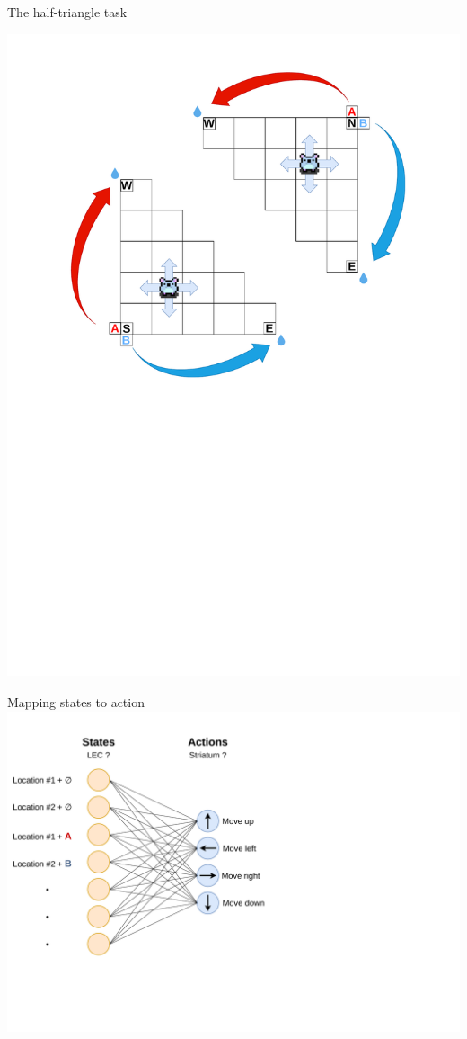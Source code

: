 \documentclass[bigger]{beamer}
\begin{document}
\begin{frame}[label={sec:org46cf4c0}]{The half-triangle task}
\begin{center}
\includegraphics[width=.9\linewidth]{img/RL_env-triangle-task.drawio.pdf}
\end{center}
\end{frame}
\begin{frame}[label={sec:org8096796}]{Mapping states to action}
\centering
\vspace{2em}
        \includegraphics[height=0.8\textheight, trim=0cm 6cm 15cm 2cm]{img/RL_mapping-states-to-actions.drawio.pdf}
\end{frame}
\end{document}
